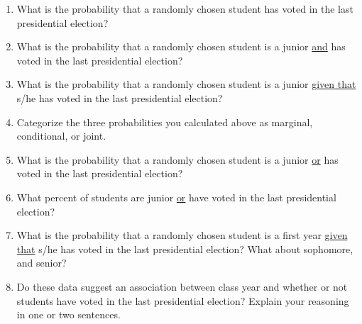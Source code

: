 \documentclass[11pt]{article}
\begin{document}
\begin{enumerate}

\item  What is the probability that a randomly chosen student has voted in the last presidential election?

\item What is the probability that a randomly chosen student is a junior \underline{and} has voted in the last presidential election?

\item What is the probability that a randomly chosen student is a junior \underline{given that} s/he has voted in the last presidential election?

\item Categorize the three probabilities you calculated above as marginal, conditional, or joint.

\item What is the probability that a randomly chosen student is a junior \underline{or} has voted in the last presidential election?

\item What percent of students are junior \underline{or} have voted in the last presidential election?

\item What is the probability that a randomly chosen student is a first year \underline{given that} s/he has voted in the last presidential election? What about sophomore, and senior?

\item Do these data suggest an association between class year and whether or not students have voted in the last presidential election? Explain your reasoning in one or two sentences.

\end{enumerate}

\end{document}
